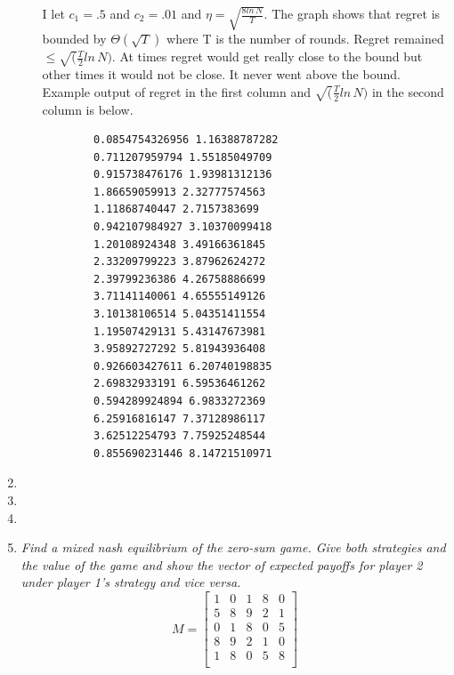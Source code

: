 \documentclass[12pt]{article}
\begin{document}
\begin{enumerate}
\begin{enumerate}
\begin{figure}[H]
  	    \end{figure}
  	    I let $c_1 = .5$ and $c_2 = .01$ and $\eta = \sqrt{\frac{8ln\,N}{T}}$. 
  	    The graph shows that regret is bounded by $\Theta{(\sqrt{T})}$ where T is the number of rounds. Regret remained
  	    $\le \sqrt(\frac{T}{2}ln\,N)$.  At times regret would get really close to
  	    the bound but other times it would not be close.  It never went above the
  	    bound. Example output of regret in the first column and
  	    $\sqrt(\frac{T}{2}ln\,N)$ in the second column is below.
  	    \scriptsize
  	    \begin{verbatim}
		0.0854754326956 1.16388787282
		0.711207959794 1.55185049709
		0.915738476176 1.93981312136
		1.86659059913 2.32777574563
		1.11868740447 2.7157383699
		0.942107984927 3.10370099418
		1.20108924348 3.49166361845
		2.33209799223 3.87962624272
		2.39799236386 4.26758886699
		3.71141140061 4.65555149126
		3.10138106514 5.04351411554
		1.19507429131 5.43147673981
		3.95892727292 5.81943936408
		0.926603427611 6.20740198835
		2.69832933191 6.59536461262
		0.594289924894 6.9833272369
		6.25916816147 7.37128986117
		3.62512254793 7.75925248544
		0.855690231446 8.14721510971
  	    \end{verbatim}
  	    \normalsize
  	\end{enumerate}
  \item
  \item
  \item
  \item \textit{Find a mixed nash equilibrium of the zero-sum game.  Give both
  strategies and the value of the game and show the vector of expected payoffs
  for player 2 under player 1's strategy and vice versa.}
    $$
    M = \begin{bmatrix}
        1 & 0 & 1 & 8 & 0\\
        5 & 8 & 9 & 2 & 1\\
        0 & 1 & 8 & 0 & 5\\
        8 & 9 & 2 & 1 & 0\\
        1 & 8 & 0 & 5 & 8\\
        \end{bmatrix}
    $$
    
\end{enumerate}
\end{document}
